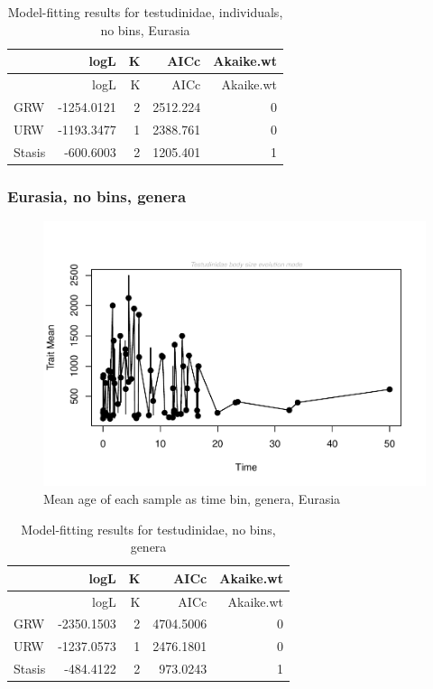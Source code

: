 \documentclass[]{article}
\begin{document}
\begin{longtable}[]{@{}lrrrr@{}}
\caption{Model-fitting results for testudinidae, individuals, no bins,
Eurasia}\tabularnewline
\toprule
& logL & K & AICc & Akaike.wt\tabularnewline
\midrule
\endfirsthead
\toprule
& logL & K & AICc & Akaike.wt\tabularnewline
\midrule
\endhead
GRW & -1254.0121 & 2 & 2512.224 & 0\tabularnewline
URW & -1193.3477 & 1 & 2388.761 & 0\tabularnewline
Stasis & -600.6003 & 2 & 1205.401 & 1\tabularnewline
\bottomrule
\end{longtable}

\newpage 

\subsubsection{Eurasia, no bins, genera}\label{eurasia-no-bins-genera}

\begin{figure}[htbp]
\centering
\includegraphics{MA_JJ_files/figure-latex/paleoTS with different time bins, no bins, genera, Eurasia-1.pdf}
\caption{Mean age of each sample as time bin, genera, Eurasia}
\end{figure}

\begin{longtable}[]{@{}lrrrr@{}}
\caption{Model-fitting results for testudinidae, no bins,
genera}\tabularnewline
\toprule
& logL & K & AICc & Akaike.wt\tabularnewline
\midrule
\endfirsthead
\toprule
& logL & K & AICc & Akaike.wt\tabularnewline
\midrule
\endhead
GRW & -2350.1503 & 2 & 4704.5006 & 0\tabularnewline
URW & -1237.0573 & 1 & 2476.1801 & 0\tabularnewline
Stasis & -484.4122 & 2 & 973.0243 & 1\tabularnewline
\bottomrule
\end{longtable}
\end{document}
